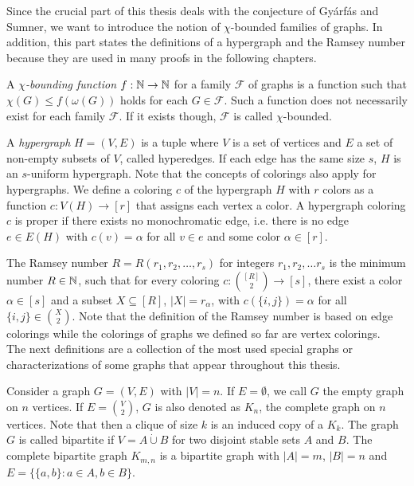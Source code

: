 Since the crucial part of this thesis deals with the conjecture of Gyárfás and Sumner, we want to introduce the notion of $\chi$-bounded families of graphs. In addition, this part states the definitions of a hypergraph and the Ramsey number because they are used in many proofs in the following chapters.

\begin{defn}\label{d1}
A $\chi$\textit{-bounding function} $f:\mathbb{N}\to\mathbb{N}$ for a family $\mathcal{F}$ of graphs is a function such that $\chi (G)\leq f(\omega (G))$ holds for each $G\in\mathcal{F}$. Such a function does not necessarily exist for each family $\mathcal{F}$. If it exists though, $\mathcal{F}$ is called $\chi$-bounded. 
\end{defn}

A \textit{hypergraph} $H=(V,E)$ is a tuple where $V$ is a set of vertices and $E$ a set of non-empty subsets of $V$, called hyperedges. If each edge has the same size $s$, $H$ is an $s$-uniform hypergraph. Note that the concepts of colorings also apply for hypergraphs. We define a coloring $c$ of the hypergraph $H$ with $r$ colors as a function $c:V(H)\to [r]$ that assigns each vertex a color. A hypergraph coloring $c$ is proper if there exists no monochromatic edge, i.e. there is no edge $e\in E(H)$ with $c(v)=\alpha$ for all $v\in e$ and some color $\alpha\in [r]$.

The Ramsey number $R=R(r_1, r_2, \dots ,r_s)$ for integers $r_1, r_2, \dots r_s$ is the minimum number $R\in\mathbb{N}$, such that for every coloring $c:{[R]\choose 2}\to [s]$, there exist a color $\alpha\in [s]$ and a subset $X\subseteq [R]$, $\vert X\vert =r_{\alpha}$, with $c(\lbrace i,j\rbrace )=\alpha$ for all $\lbrace i,j\rbrace\in {X\choose 2}$. Note that the definition of the Ramsey number is based on edge colorings while the colorings of graphs we defined so far are vertex colorings.\\

The next definitions are a collection of the most used special graphs or characterizations of some graphs that appear throughout this thesis.

Consider a graph $G=(V,E)$ with $\vert V\vert = n$. If $E=\emptyset$, we call $G$ the empty graph on $n$ vertices. If $E= {V\choose{2}}$, $G$ is also denoted as $K_n$, the complete graph on $n$ vertices. Note that then a clique of size $k$ is an induced copy of a $K_k$. The graph $G$ is called bipartite if $V=A\dot{\cup} B$ for two disjoint stable sets $A$ and $B$. The complete bipartite graph $K_{m,n}$ is a bipartite graph with $\vert A\vert =m$, $\vert B\vert =n$ and $E=\lbrace \lbrace a,b\rbrace :a\in A,b\in B\rbrace$.

